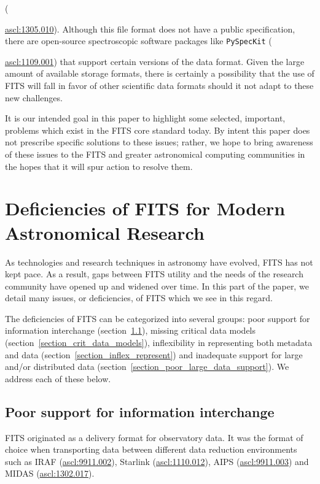 \documentclass[final,authoryear,5p,times,twocolumn]{elsarticle}
\begin{document}
({\href{http://ascl.net/1305.010}{ascl:1305.010}). Although this file
format does not have a public specification,  there are open-source
spectroscopic software packages like \texttt{PySpecKit}
({\href{http://ascl.net/1109.001}{ascl:1109.001}) that support certain
versions of the data format.  Given the large amount of available
storage formats, there is certainly a possibility that the use of FITS
will fall in favor of other scientific data formats should it not adapt
to these new challenges.


It is our intended goal in this paper to highlight some selected,
important, problems which exist in the FITS core standard today.
By intent this paper does not prescribe specific solutions to these issues;
rather, we hope to bring awareness of these issues to the FITS and greater
astronomical computing communities in the hopes that
it will spur action to resolve them.

\section{Deficiencies of FITS for Modern Astronomical Research}
\label{section_deficiencies}

As technologies and research techniques in astronomy have evolved, FITS
has not kept pace. As a result, gaps between FITS utility and the
needs of the research community have opened up and widened over time. In
this part of the paper, we detail many issues, or deficiencies, of FITS
which we see in this regard.


The deficiencies of FITS can be categorized into several groups: poor
support for information interchange
(section~\ref{section_poor_exchange}), missing critical data models
(section~\ref{section_crit_data_models}), inflexibility in representing
both metadata and data (section~\ref{section_inflex_represent}) and
inadequate support for large and/or distributed data
(section~\ref{section_poor_large_data_support}). We address each of
these below.

\subsection{Poor support for information interchange}
\label{section_poor_exchange}

FITS originated as a delivery format for observatory data. It was the format
of choice when transporting data between different data reduction
environments such as IRAF (\href{http://ascl.net/9911.002}{ascl:9911.002}),
Starlink (\href{http://ascl.net/1110.012}{ascl:1110.012}), AIPS
(\href{http://ascl.net/9911.003}{ascl:9911.003}) and MIDAS
(\href{http://ascl.net/1302.017}{ascl:1302.017}).


}}
\end{document}
